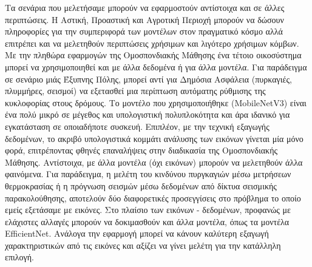 Τα σενάρια που μελετήσαμε μπορούν να εφαρμοστούν αντίστοιχα και σε άλλες περιπτώσεις. Η Αστική, Προαστική και Αγροτική Περιοχή μπορούν να δώσουν πληροφορίες για την συμπεριφορά των μοντέλων στον πραγματικό κόσμο αλλά επιτρέπει και να μελετηθούν περιπτώσεις χρήσιμων και λιγότερο χρήσιμων κόμβων. Με την πληθώρα εφαρμογών της Ομοσπονδιακής Μάθησης ένα τέτοιο οικοσύστημα μπορεί να χρησιμοποιηθεί και με άλλα δεδομένα ή για άλλα μοντέλα. Για παράδειγμα σε σενάριο μιάς Έξυπνης Πόλης, μπορεί αντί για Δημόσια Ασφάλεια (πυρκαγιές, πλυμμήρες, σεισμοί) να εξετασθεί μια περίπτωση αυτόματης ρύθμισης της κυκλοφορίας στους δρόμους. Το μοντέλο που χρησιμοποιήθηκε (MobileNetV3) είναι ένα πολύ μικρό σε μέγεθος και υπολογιστική πολυπλοκότητα και άρα ιδανικό για εγκατάσταση σε οποιαδήποτε συσκευή. Επιπλέον, με την τεχνική εξαγωγής δεδομένων, το ακριβό υπολογιστικά κομμάτι ανάλυσης των εικόνων γίνεται μία μόνο φορά, επιτρέποντας φθηνές επαναλήψεις στην διαδικασία της Ομοσπονδιακής Μάθησης. Αντίστοιχα, με άλλα μοντέλα (όχι εικόνων) μπορούν να μελετηθούν άλλα φαινόμενα. Για παράδειγμα, η μελέτη του κινδύνου πυργκαγιών μέσω μετρήσεων θερμοκρασίας ή η πρόγνωση σεισμών μέσω δεδομένων από δίκτυα σεισμικής παρακολούθησης, αποτελούν δύο διαφορετικές προσεγγίσεις στο πρόβλημα το οποίο εμείς εξετάσαμε με εικόνες. Στο πλαίσιο των εικόνων - δεδομένων, προφανώς με ελάχιστες αλλαγές μπορούν να δοκιμασθούν και άλλα μοντέλα, όπως τα μοντέλα EfficientNet. Ανάλογα την εφαρμογή μπορεί να κάνουν καλύτερη εξαγωγή χαρακτηριστικών από τις εικόνες και αξίζει να γίνει μελέτη για την κατάλληλη επιλογή.
